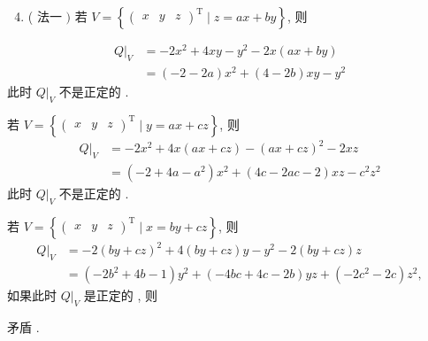\documentclass[10pt]{article}
\begin{document}
\begin{enumerate}
  \setcounter{enumi}{3}
  \item ( 法一  $)$  若  $V=\left\{\left(\begin{array}{lll}x & y & z\end{array}\right)^{\mathrm{T}} \mid z=a x+b y\right\}$,  则 
\end{enumerate}
$$
\begin{aligned}
\left.Q\right|_{V} &=-2 x^{2}+4 x y-y^{2}-2 x(a x+b y) \\
&=(-2-2 a) x^{2}+(4-2 b) x y-y^{2}
\end{aligned}
$$
 此时  $\left.Q\right|_{V}$  不是正定的 .

 若  $V=\left\{\left(\begin{array}{lll}x & y & z\end{array}\right)^{\mathrm{T}} \mid y=a x+c z\right\}$,  则 
$$
\begin{aligned}
\left.Q\right|_{V} &=-2 x^{2}+4 x(a x+c z)-(a x+c z)^{2}-2 x z \\
&=\left(-2+4 a-a^{2}\right) x^{2}+(4 c-2 a c-2) x z-c^{2} z^{2}
\end{aligned}
$$
 此时  $\left.Q\right|_{V}$  不是正定的 .

 若  $V=\left\{\left(\begin{array}{lll}x & y & z\end{array}\right)^{\mathrm{T}} \mid x=b y+c z\right\}$,  则 
$$
\begin{aligned}
\left.Q\right|_{V} &=-2(b y+c z)^{2}+4(b y+c z) y-y^{2}-2(b y+c z) z \\
&=\left(-2 b^{2}+4 b-1\right) y^{2}+(-4 b c+4 c-2 b) y z+\left(-2 c^{2}-2 c\right) z^{2},
\end{aligned}
$$
 如果此时  $\left.Q\right|_{V}$  是正定的 ,  则 

 矛盾 .
\end{document}
